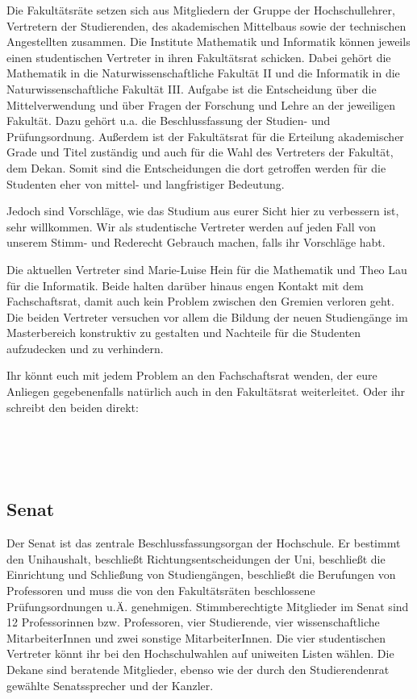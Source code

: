 Die Fakultätsräte setzen sich aus Mitgliedern der Gruppe der Hochschullehrer, Vertretern der Studierenden, des akademischen Mittelbaus sowie der technischen Angestellten zusammen.
Die Institute Mathematik und Informatik können jeweils einen studentischen Vertreter in ihren Fakultätsrat schicken.
Dabei gehört die Mathematik in die Naturwissenschaftliche Fakultät II und die Informatik in die Naturwissenschaftliche Fakultät III.
Aufgabe ist die Entscheidung über die Mittelverwendung und über Fragen der Forschung und Lehre an der jeweiligen Fakultät.
Dazu gehört u.a. die Beschlussfassung der Studien- und Prüfungsordnung.
Außerdem ist der Fakultätsrat für die Erteilung akademischer Grade und Titel zuständig und auch für die Wahl des Vertreters der Fakultät, dem Dekan.
Somit sind die Entscheidungen die dort getroffen werden für die Studenten eher von mittel- und langfristiger Bedeutung.

Jedoch sind Vorschläge, wie das Studium aus eurer Sicht hier zu verbessern ist, sehr willkommen.
Wir als studentische Vertreter werden auf jeden Fall von unserem Stimm- und Rederecht Gebrauch machen, falls ihr Vorschläge habt.

Die aktuellen Vertreter sind Marie-Luise Hein für die Mathematik und Theo Lau für die Informatik.
Beide halten darüber hinaus engen Kontakt mit dem Fachschaftsrat, damit auch kein Problem zwischen den Gremien verloren geht.
Die beiden Vertreter versuchen vor allem die Bildung der neuen Studiengänge im Masterbereich konstruktiv zu gestalten und Nachteile für die Studenten aufzudecken und zu verhindern.

Ihr könnt euch mit jedem Problem an den Fachschaftsrat wenden, der eure Anliegen gegebenenfalls natürlich auch in den Fakultätsrat weiterleitet.
Oder ihr schreibt den beiden direkt:

\\
\\
\\
    
        
\subsection{Senat}
\label{senat}

Der Senat ist das zentrale Beschlussfassungsorgan der Hochschule.
Er bestimmt den Unihaushalt, beschließt Richtungsentscheidungen der Uni, beschließt die Einrichtung und Schließung von Studiengängen, beschließt die Berufungen von Professoren und muss die von den Fakultätsräten beschlossene Prüfungsordnungen u.Ä. genehmigen.
Stimmberechtigte Mitglieder im Senat sind 12 Professorinnen bzw. Professoren, vier Studierende, vier wissenschaftliche MitarbeiterInnen und zwei sonstige MitarbeiterInnen.
Die vier studentischen Vertreter könnt ihr bei den Hochschulwahlen auf uniweiten Listen wählen.
Die Dekane sind beratende Mitglieder, ebenso wie der durch den Studierendenrat gewählte Senatssprecher und der Kanzler.

